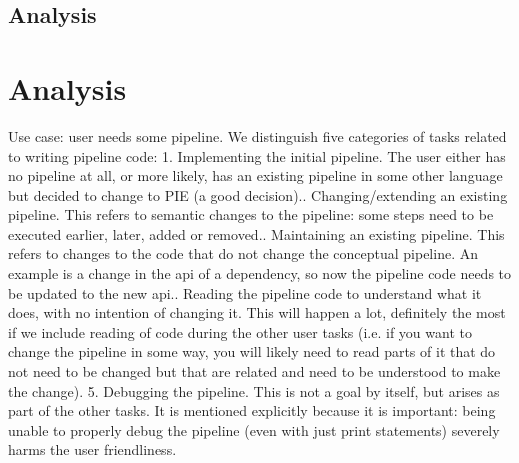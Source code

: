 
\subsection{Analysis}
\label{sec:evaluation__testing__analysis}


\section{Analysis}
\label{sec:evaluation__analysis}

Use case: user needs some pipeline.
We distinguish five categories of tasks related to writing pipeline code:
1. Implementing the initial pipeline. The user either has no pipeline at all, or more likely, has an existing pipeline in some other language but decided to change to PIE (a good decision).. Changing/extending an existing pipeline. This refers to semantic changes to the pipeline: some steps need to be executed earlier, later, added or removed.. Maintaining an existing pipeline. This refers to changes to the code that do not change the conceptual pipeline. An example is a change in the api of a dependency, so now the pipeline code needs to be updated to the new api.. Reading the pipeline code to understand what it does, with no intention of changing it. This will happen a lot, definitely the most if we include reading of code during the other user tasks (i.e. if you want to change the pipeline in some way, you will likely need to read parts of it that do not need to be changed but that are related and need to be understood to make the change).
5. Debugging the pipeline. This is not a goal by itself, but arises as part of the other tasks. It is mentioned explicitly because it is important: being unable to properly debug the pipeline (even with just print statements) severely harms the user friendliness.



